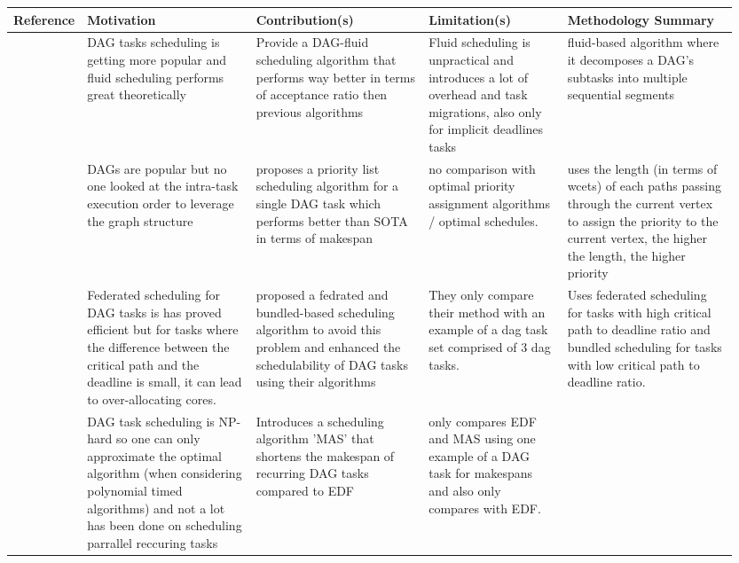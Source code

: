 \documentclass{article}
\begin{document}
\begin{longtable}{|l|p{0.25\linewidth}|p{0.25\linewidth}|p{0.20\linewidth}|p{0.25\linewidth}|}
        \hline
        \textbf{Reference} & \textbf{Motivation} & \textbf{Contribution(s)} & \textbf{Limitation(s)} & \textbf{Methodology Summary}\\
        \hline
        \cite{guan2021DAGfluid}  & DAG tasks scheduling is getting more popular and fluid scheduling performs great theoretically & Provide a DAG-fluid scheduling algorithm
        that performs way better in terms of acceptance ratio then previous algorithms & Fluid scheduling is unpractical and introduces a lot of overhead and task migrations, also only for implicit deadlines tasks
        & fluid-based algorithm where it decomposes a DAG's subtasks into multiple sequential segments\\
        \hline
        \cite{He2019DagIntra}  & DAGs are popular but no one looked at the intra-task execution order to leverage the graph structure & proposes a priority list scheduling algorithm for a single DAG task
        which performs better than SOTA in terms of makespan & no comparison with optimal priority assignment algorithms / optimal schedules.  & uses the length (in terms of wcets) of each paths passing through the current vertex to assign the priority to the current vertex,
        the higher the length, the higher priority \\
        \hline
        \cite{Kobayashi2023FedBundledDagsched} & Federated scheduling for DAG tasks is has proved efficient but 
        for tasks where the difference between the critical path and the deadline is small, it
        can lead to over-allocating cores.  & proposed a fedrated and bundled-based scheduling algorithm to avoid this problem and enhanced the schedulability of DAG tasks using their algorithms & They only compare their method with an example of a dag task set comprised of 3 dag tasks. & Uses federated scheduling for tasks with high critical path to deadline ratio and bundled scheduling for tasks with low critical path to deadline ratio. \\
        \hline
        \cite{Xiao2019} & DAG task scheduling is NP-hard so one can only approximate the optimal algorithm (when considering polynomial timed algorithms)
        and not a lot has been done on scheduling parrallel reccuring tasks & Introduces a scheduling algorithm 'MAS' that shortens the makespan of recurring DAG tasks compared to EDF & only compares EDF and MAS using one example of a DAG task for makespans and also only compares with EDF.

\end{longtable}
\end{document}
